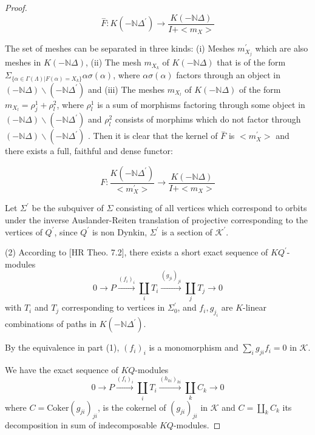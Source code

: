 \documentclass{amsart}
\theoremstyle{plain}
\numberwithin{equation}{section}
\begin{document}
\begin{proof}
\begin{equation*}
\overset{-}{F}:K(-\mathbb{N}\Delta ^{\prime })\rightarrow \frac{K(-\mathbb{N}\Delta )}{I+<m_{X}>}
\end{equation*}

The set of meshes can be separated in three kinds: (i) Meshes $m_{X_{j}}^{\prime }$ which are also meshes in $K(-\mathbb{N}\Delta )$, (ii)
The mesh $m_{X_{k}}$ of $K(-\mathbb{N}\Delta )$ that is of the form $\Sigma
_{\{\alpha \in \Gamma (\varLambda)|F(\alpha )=X_{k}\}}\alpha \sigma (\alpha
) $, where $\alpha \sigma (\alpha )$ factors through an object in $(-\mathbb{N}\Delta )\smallsetminus(-\mathbb{N}\Delta ^{\prime })$ and (iii) The meshes
$m_{X_{l}}$ of $K(-\mathbb{N}\Delta )$ of the form $m_{X_{l}}=\rho
_{j}^{1}+\rho _{l}^{2} $, where $\rho _{l}^{1}$ is a sum of morphisms
factoring through some object in $(-\mathbb{N}\Delta )\smallsetminus(-\mathbb{N}\Delta ^{\prime })$ and $\rho _{l}^{2}$ consists of morphims which
do not factor through $(-\mathbb{N}\Delta )\smallsetminus(-\mathbb{N}\Delta
^{\prime })$ . Then it is clear that the kernel of $\overset{-}{F}$ is $<m_{X}^{\prime }>$ and there exists a full, faithful and dense functor:

\begin{equation*}
F:\frac{K(-\mathbb{N}\Delta ^{\prime })}{<m_{X}^{\prime }>}\rightarrow \frac{K(-\mathbb{N}\Delta )}{I+<m_{X}>}
\end{equation*}

Let $\Sigma ^{\prime }$ be the subquiver of $\Sigma $ consisting of all
vertices which correspond to orbits under the inverse Auslander-Reiten
translation of projective corresponding to the vertices of $Q^{\prime }$,
since $Q^{\prime }$ is non Dynkin, $\Sigma ^{\prime }$ is a section of $\mathcal{K}^{\prime }$.

(2) According to [HR Theo. 7.2], there exists a short exact sequence of $KQ^{\prime }$-modules
\begin{equation*}
0\rightarrow P\xrightarrow{(f_i)_i}\coprod_{i}T_{i}\xrightarrow{(g_{ji})_{ji}}\coprod_{j}T_{j}\rightarrow 0
\end{equation*}with $T_{i}$ and $T_{j}$ corresponding to vertices in $\Sigma _{0}^{\prime }$, and $f_{i},g_{j_{i}}$ are $K$-linear combinations of paths in $K(-\mathbb{N}\Delta ^{\prime })$.

By the equivalence in part (1), $(f_{i})_{i}$ is a monomorphism and $\sum_{i} g_{ji}f_{i}=0$ in $\mathcal{K}$.

We have the exact sequence of $KQ$-modules
\begin{equation*}
0\rightarrow P\xrightarrow{(f_i)_i}\coprod_{i}T_{i}\xrightarrow{(h_{ki})_{ki}}\coprod_{k}C_{k}\rightarrow 0
\end{equation*}
where $C=\mathrm{Coker}(g_{ji})_{ji}$, is the cokernel of $(g_{ji})_{ji}$ in
$\mathcal{K}$ and $C=\coprod_{k}C_{k}$ its decomposition in sum of
indecomposable $KQ$-modules.


\end{proof}
\end{document}
